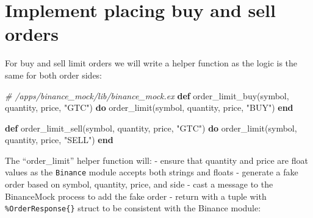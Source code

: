 \documentclass[
  oneside]{book}
\newenvironment{Shaded}{\begin{snugshade}}{\end{snugshade}}
\newcommand{\CommentTok}[1]{\textcolor[rgb]{0.56,0.35,0.01}{\textit{#1}}}
\newcommand{\KeywordTok}[1]{\textcolor[rgb]{0.13,0.29,0.53}{\textbf{#1}}}
\newcommand{\NormalTok}[1]{#1}
\newcommand{\StringTok}[1]{\textcolor[rgb]{0.31,0.60,0.02}{#1}}
\begin{document}
\hypertarget{implement-placing-buy-and-sell-orders}{%
\section{Implement placing buy and sell orders}\label{implement-placing-buy-and-sell-orders}}

For buy and sell limit orders we will write a helper function as the logic is
the same for both order sides:

\begin{Shaded}
\begin{Highlighting}[]
\CommentTok{\# /apps/binance\_mock/lib/binance\_mock.ex}
  \KeywordTok{def}\NormalTok{ order\_limit\_buy(symbol, quantity, price, }\StringTok{"GTC"}\NormalTok{) }\KeywordTok{do}
\NormalTok{    order\_limit(symbol, quantity, price, }\StringTok{"BUY"}\NormalTok{)}
  \KeywordTok{end}

  \KeywordTok{def}\NormalTok{ order\_limit\_sell(symbol, quantity, price, }\StringTok{"GTC"}\NormalTok{) }\KeywordTok{do}
\NormalTok{    order\_limit(symbol, quantity, price, }\StringTok{"SELL"}\NormalTok{)}
  \KeywordTok{end}
\end{Highlighting}
\end{Shaded}

The ``order\_limit'' helper function will:
- ensure that quantity and price are float values as the \texttt{Binance} module accepts both strings and floats
- generate a fake order based on symbol, quantity, price, and side
- cast a message to the BinanceMock process to add the fake order
- return with a tuple with \texttt{\%OrderResponse\{\}} struct to be consistent with the Binance module:
\end{document}
